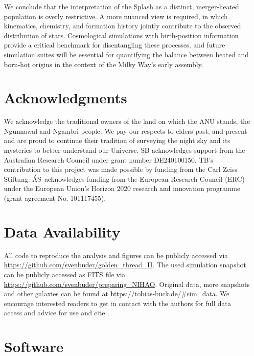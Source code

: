 \documentclass[fleqn,usenatbib]{mnras}
\begin{document}
We conclude that the interpretation of the Splash as a distinct, merger-heated population is overly restrictive. A more nuanced view is required, in which kinematics, chemistry, and formation history jointly contribute to the observed distribution of stars. Cosmological simulations with birth-position information provide a critical benchmark for disentangling these processes, and future simulation suites will be essential for quantifying the balance between heated and born-hot origins in the context of the Milky Way’s early assembly.

\section*{Acknowledgments}

We acknowledge the traditional owners of the land on which the ANU stands, the Ngunnawal and Ngambri people. We pay our respects to elders past, and present and are proud to continue their tradition of surveying the night sky and its mysteries to better understand our Universe. SB acknowledges support from the Australian Research Council under grant number DE240100150.
TB's contribution to this project was made possible by funding from the Carl Zeiss Stiftung. \'{A}S~acknowledges funding from the European Research Council (ERC) under the European Union’s Horizon 2020 research and innovation programme (grant agreement No. 101117455).

\section*{Data Availability}

All code to reproduce the analysis and figures can be publicly accessed via \url{https://github.com/svenbuder/golden_thread_II}.
The used simulation snapshot can be publicly accessed as FITS file via \url{https://github.com/svenbuder/preparing_NIHAO}. Original data, more snapshots and other galaxies can be found at \url{https://tobias-buck.de/#sim_data}. We encourage interested readers to get in contact with the authors for full data access and advice for use and cite \citet{Buck2020b, Buck2021}.

\section*{Software}
\end{document}
